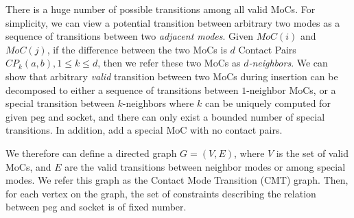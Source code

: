 \documentclass[11pt, twocolumn]{article}
\begin{document}




There is a huge number of possible transitions among all valid MoCs. For simplicity, we can view a potential transition between arbitrary two modes as a sequence of transitions between two {\em adjacent modes}. Given $MoC(i)$ and $MoC(j)$, if the difference between the two MoCs is $d$ Contact Pairs $CP_k(a, b), 1\leq k\leq d$, then we refer these two MoCs as {\em $d$-neighbors}. We can show that arbitrary {\em valid} transition between two MoCs during insertion can be decomposed to either a sequence of transitions between $1$-neighbor MoCs, or a special transition between $k$-neighbors where $k$ can be uniquely computed for given peg and socket, and there can only exist a bounded number of special transitions. In addition, add a special MoC with no contact pairs. 

We therefore can define a directed graph $G = (V, E)$, where $V$ is the set of valid MoCs, and $E$ are the valid transitions between neighbor modes or among special modes. We refer this graph as the Contact Mode Transition (CMT) graph. Then, for each vertex on the graph, the set of constraints describing the relation between peg and socket is of fixed number. 

\end{document}
